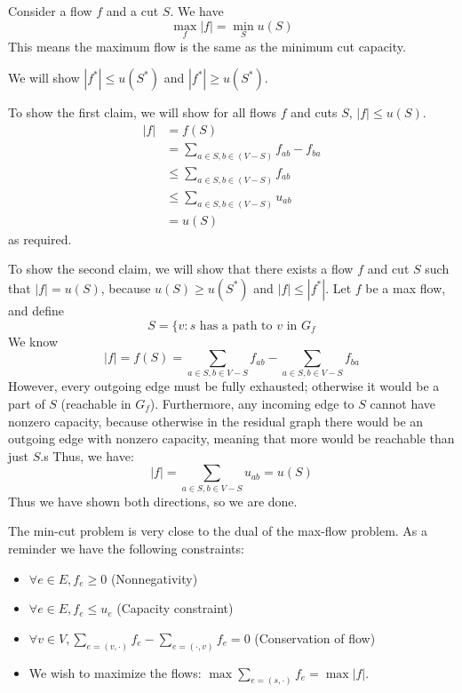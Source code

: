 \begin{theorem}
    Consider a flow $f$ and a cut $S$. We have
    \[\max_f |f| = \min_S u(S)\]
    This means the maximum flow is the same as the minimum cut capacity.
    
    \begin{proof*}
        We will show $|f^*| \leq u(S^*)$ and $|f^*| \geq u(S^*)$.

        To show the first claim, we will show for all flows $f$ and cuts $S$, $|f| \leq u(S)$.
        \begin{align*}
            |f| &= f(S) \\
            &= \sum_{a \in S, b \in (V - S)} f_{ab} - f_{ba} \\
            &\leq \sum_{a \in S, b \in (V - S)} f_{ab} \\
            &\leq \sum_{a \in S, b \in (V - S)} u_{ab} \\
            &= u(S)
        \end{align*}
        as required.

        To show the second claim, we will show that there exists a flow $f$ and cut $S$ such that
        $|f| = u(S)$, because $u(S) \geq u(S^*)$ and $|f| \leq |f^*|$. Let $f$ be a max flow, and define
        \[ S = \{ v: \text{$s$ has a path to $v$ in $G_f$} \]
        We know \[|f| = f(S) = \sum_{a \in S, b \in V - S} f_{ab} - \sum_{a \in S, b \in V - S} f_{ba}\]
        However, every outgoing edge must be fully exhausted; otherwise it would be a part of $S$ (reachable in $G_f$).
        Furthermore, any incoming edge to $S$ cannot have nonzero capacity, because otherwise in the residual graph there would be
        an outgoing edge with nonzero capacity, meaning that more would be reachable than just $S$.s
        Thus, we have:
        \[ |f| = \sum_{a \in S, b \in V - S} u_{ab} = u(S) \]
        Thus we have shown both directions, so we are done.
    \end{proof*}
\end{theorem}

The min-cut problem is very close to the dual of the max-flow problem. As a reminder we have the following constraints:
\begin{itemize}
    \item $\forall e \in E, f_e \geq 0$ (Nonnegativity)
    \item $\forall e \in E, f_e \leq u_e$ (Capacity constraint)
    \item $\forall v \in V, \sum_{e = (v, \cdot)} f_e - \sum_{e = (\cdot, v)} f_e = 0$ (Conservation of flow)
    \item We wish to maximize the flows: $\max \sum_{e = (s, \cdot)} f_e = \max |f|$.
\end{itemize}

